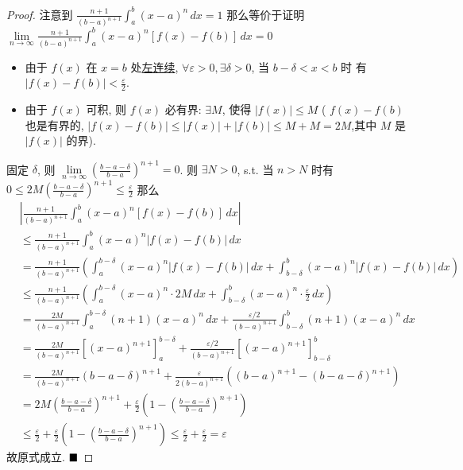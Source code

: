 \documentclass[lang=cn,newtx,10pt,scheme=chinese]{elegantbook}
\begin{document}
\begin{proof}
注意到 $\frac{n+1}{(b-a)^{n+1}} \int_a^b (x-a)^n \,dx = 1$
那么等价于证明 $\lim\limits_{n \to \infty} \frac{n+1}{(b-a)^{n+1}} \int_a^b (x-a)^n [f(x)-f(b)] \,dx = 0$
\begin{itemize}
    \item 由于 $f(x)$ 在 $x=b$ 处\underline{左连续}, $\forall \varepsilon > 0, \exists \delta > 0$, 当 $b-\delta < x < b$ 时
有 $|f(x)-f(b)| < \frac{\varepsilon}{2}$.
    \item 由于 $f(x)$ 可积, 则 $f(x)$ 必有界: $\exists M$, 使得 $|f(x)| \leq M$ ( $f(x)-f(b)$ 也是有界的, $|f(x)-f(b)| \leq |f(x)| + |f(b)| \leq M + M = 2M$,其中 $M$ 是 $|f(x)|$ 的界).
\end{itemize}



固定 $\delta$, 则 $\lim\limits_{n \to \infty} \left(\frac{b-a-\delta}{b-a}\right)^{n+1} = 0$. 则 $\exists N>0$, s.t. 当 $n>N$ 时有
$0 \leq 2M \left(\frac{b-a-\delta}{b-a}\right)^{n+1} \leq \frac{\varepsilon}{2}$ 
那么
\begin{align*} &\left| \frac{n+1}{(b-a)^{n+1}} \int_a^b (x-a)^n [f(x)-f(b)] \,dx \right| \\ &\leq \frac{n+1}{(b-a)^{n+1}} \int_a^b (x-a)^n |f(x)-f(b)| \,dx \\ &= \frac{n+1}{(b-a)^{n+1}} \left( \int_a^{b-\delta} (x-a)^n |f(x)-f(b)| \,dx + \int_{b-\delta}^b (x-a)^n |f(x)-f(b)| \,dx \right) \\ &\leq \frac{n+1}{(b-a)^{n+1}} \left( \int_a^{b-\delta} (x-a)^n \cdot 2M \,dx + \int_{b-\delta}^b (x-a)^n \cdot \frac{\varepsilon}{2} \,dx \right) \\ &= \frac{2M}{(b-a)^{n+1}} \int_a^{b-\delta} (n+1)(x-a)^n \,dx + \frac{\varepsilon/2}{(b-a)^{n+1}} \int_{b-\delta}^b (n+1)(x-a)^n \,dx \\ &= \frac{2M}{(b-a)^{n+1}} \left[ (x-a)^{n+1} \right]_a^{b-\delta} + \frac{\varepsilon/2}{(b-a)^{n+1}} \left[ (x-a)^{n+1} \right]_{b-\delta}^b \\ &= \frac{2M}{(b-a)^{n+1}} (b-a-\delta)^{n+1} + \frac{\varepsilon}{2(b-a)^{n+1}} \left( (b-a)^{n+1} - (b-a-\delta)^{n+1} \right) \\ &= 2M \left(\frac{b-a-\delta}{b-a}\right)^{n+1} + \frac{\varepsilon}{2} \left( 1 - \left(\frac{b-a-\delta}{b-a}\right)^{n+1} \right) \\ &\leq \frac{\varepsilon}{2} + \frac{\varepsilon}{2} \left( 1 - \left(\frac{b-a-\delta}{b-a}\right)^{n+1} \right) \leq \frac{\varepsilon}{2} + \frac{\varepsilon}{2} = \varepsilon \end{align*}
故原式成立.
$\hfill \blacksquare$
\end{proof}
\end{document}

